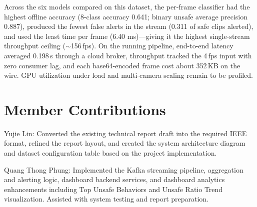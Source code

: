 \documentclass[conference]{IEEEtran}
\begin{document}
Across the six models compared on this dataset, the per-frame classifier
had the highest offline accuracy (8-class accuracy 0.641; binary unsafe
average precision 0.887), produced the fewest false alerts in the stream
(0.311 of safe clips alerted), and used the least time per frame
(6.40 ms)---giving it the highest single-stream throughput ceiling
($\sim$156\,fps). On the running pipeline, end-to-end latency averaged
0.198\,s through a cloud broker, throughput tracked the 4\,fps input with zero
consumer lag, and each base64-encoded frame cost about 352\,KB on the wire. GPU
utilization under load and multi-camera scaling remain to be profiled.



\section*{Member Contributions}
Yujie Lin: Converted the existing technical report draft into the required IEEE format, refined the report layout, and created the system architecture diagram and dataset configuration table based on the project implementation.


Quang Thong Phung: Implemented the Kafka streaming pipeline, aggregation and alerting logic, dashboard backend services, and dashboard analytics enhancements including Top Unsafe Behaviors and Unsafe Ratio Trend visualization. Assisted with system testing and report preparation.
\end{document}
